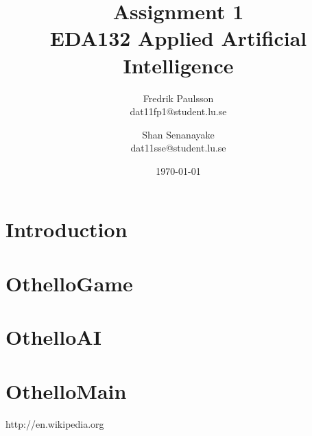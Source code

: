 \documentclass[a4paper]{article}
\title{Assignment 1 \\ EDA132 Applied Artificial Intelligence}
\date{\today}
\author{Fredrik Paulsson \\ dat11fp1@student.lu.se \and Shan Senanayake \\ dat11sse@student.lu.se}
\begin{document}
\maketitle


\section{Introduction}

\section{OthelloGame}

\section{OthelloAI}

\section{OthelloMain}


\begin{thebibliography}{1}
http://en.wikipedia.org
\end{thebibliography}
\end{document}
